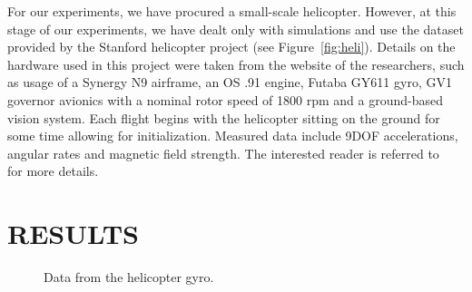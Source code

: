 \documentclass{article}
\begin{document}




For our experiments, we have procured a small-scale helicopter.  However, at this stage of our experiments, we have dealt only with simulations and use the dataset provided by the Stanford helicopter project (see Figure~\ref{fig:heli}).  Details on the hardware used in this project were taken from the website of the researchers, such as usage of a Synergy N9 airframe, an OS .91 engine, Futaba GY611 gyro, GV1 governor avionics with a nominal rotor speed of 1800 rpm and a ground-based vision system.  Each flight begins with the helicopter sitting on the ground for some time allowing for initialization.  Measured data include 9DOF accelerations, angular rates and magnetic field strength.  The interested reader is referred to~\cite{dataset_StanfordHelicopter} for more details.


\section{RESULTS}
\begin{figure}[t]
\centering	
{}
\caption{Data from the helicopter gyro.}			
\end{figure}
\end{document}
